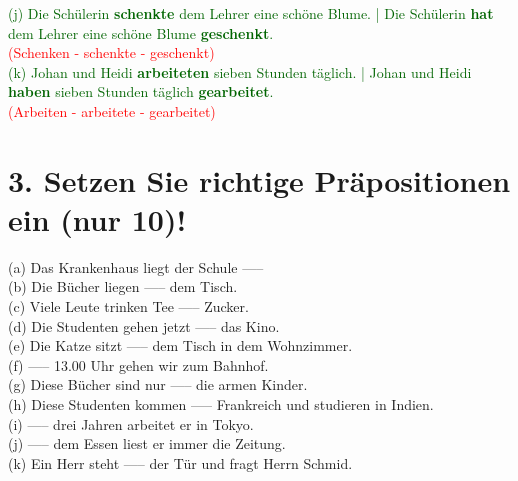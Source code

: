 \documentclass[a4paper,12pt]{article}
\begin{document}
\textcolor{darkgreen}{(j) Die Schülerin \textbf{schenkte} dem Lehrer eine schöne Blume. | Die Schülerin \textbf{hat} dem Lehrer eine schöne Blume \textbf{geschenkt}.}\\ \textcolor{red}{(Schenken - schenkte - geschenkt)}\\
\textcolor{darkgreen}{(k) Johan und Heidi \textbf{arbeiteten} sieben Stunden täglich. | Johan und Heidi \textbf{haben} sieben Stunden täglich \textbf{gearbeitet}.}\\ \textcolor{red}{(Arbeiten - arbeitete - gearbeitet)}\\



\vspace{1cm}

\section*{3. Setzen Sie richtige Präpositionen ein (nur 10)!}

(a) Das Krankenhaus liegt der Schule ----- \\
(b) Die Bücher liegen ----- dem Tisch.\\
(c) Viele Leute trinken Tee ----- Zucker.\\
(d) Die Studenten gehen jetzt ----- das Kino.\\
(e) Die Katze sitzt ----- dem Tisch in dem Wohnzimmer.\\
(f) ----- 13.00 Uhr gehen wir zum Bahnhof.\\
(g) Diese Bücher sind nur ----- die armen Kinder.\\
(h) Diese Studenten kommen ----- Frankreich und studieren in Indien.\\
(i) ----- drei Jahren arbeitet er in Tokyo.\\
(j) ----- dem Essen liest er immer die Zeitung.\\
(k) Ein Herr steht ----- der Tür und fragt Herrn Schmid.
\end{document}
